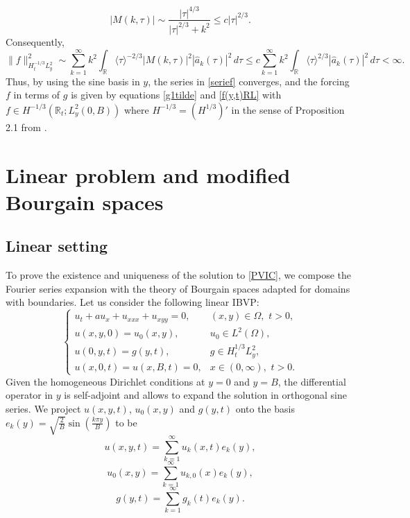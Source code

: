 \documentclass[11pt]{article}
\numberwithin{equation}{section}
\begin{document}
\begin{equation}
|M(k,\tau)| \sim \frac{|\tau|^{4/3}}{|\tau|^{2/3} + k^2} \leq  c|\tau|^{2/3}.
\end{equation}
Consequently,
\begin{equation}\label{serief}
\|f\|_{H^{-1/3}_t L^2_y}^2 \sim \sum_{k=1}^{\infty} k^2 \int_{\mathbb{R}} \langle \tau \rangle^{-2/3} |M(k,\tau)|^2 |\widehat{a}_k(\tau)|^2 \, d\tau \leq  c\sum_{k=1}^{\infty} k^2 \int_{\mathbb{R}} \langle \tau \rangle^{2/3} |\widehat{a}_k(\tau)|^2 \, d\tau < \infty.\end{equation}
Thus, by using the sine basis in $y$, the series in \eqref{serief} converges, and the forcing $f$ in terms of $g$ is given by equations \eqref{g1tilde} and \eqref{f(y,t)RL} with $f \in H^{-1/3}(\mathbb{R}_{t} ; L^{2}_{y}(0,B))$ where $H^{-1/3}=\left(H^{1/3}\right)'$ in the sense of Proposition 2.1 from \cite{CK}.

\section{Linear problem and modified Bourgain spaces}

\subsection{Linear setting}

To prove the existence and uniqueness of the solution to \eqref{PVIC}, we compose the Fourier series expansion with the theory of Bourgain spaces adapted for domains with boundaries. Let us consider the following linear IBVP:
\begin{equation}\label{PVIC_linear}
\begin{cases}
u_t + au_x + u_{xxx} + u_{xyy} = 0, & (x, y) \in \Omega, \,\, t > 0, \\
u(x, y, 0) = u_{0}(x, y), & u_{0} \in L^{2}(\Omega), \\
u(0, y, t) = g(y, t), & g \in H^{1/3}_{t} L^{2}_{y}, \\
u(x, 0, t) = u(x, B, t) = 0, & x \in (0,\infty), \,\, t > 0.
\end{cases}\end{equation}
Given the homogeneous Dirichlet conditions at $y=0$ and $y=B$, the differential operator in $y$ is self-adjoint and allows to expand the solution in orthogonal sine series.
We project $u(x,y,t)$, $u_0(x,y)$ and $g(y,t)$ onto the basis $e_{k}(y) = \sqrt{\frac{2}{B}} \sin\left(\frac{k\pi y}{B}\right)$ to be $$u(x, y, t) = \sum_{k=1}^{\infty} u_{k}(x, t) e_{k}(y),$$$$u_0(x, y) = \sum_{k=1}^{\infty} u_{k,0}(x) e_{k}(y),$$$$g(y, t) = \sum_{k=1}^{\infty} g_{k}(t) e_{k}(y).$$
\end{document}
